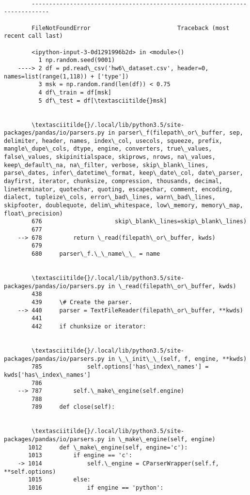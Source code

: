 \documentclass[11pt]{article}
\begin{document}
    \begin{Verbatim}[commandchars=\\\{\}]

        ---------------------------------------------------------------------------

        FileNotFoundError                         Traceback (most recent call last)

        <ipython-input-3-0d1291996b2d> in <module>()
          1 np.random.seed(9001)
    ----> 2 df = pd.read\_csv('hw6\_dataset.csv', header=0, names=list(range(1,118)) + ['type'])
          3 msk = np.random.rand(len(df)) < 0.75
          4 df\_train = df[msk]
          5 df\_test = df[\textasciitilde{}msk]


        \textasciitilde{}/.local/lib/python3.5/site-packages/pandas/io/parsers.py in parser\_f(filepath\_or\_buffer, sep, delimiter, header, names, index\_col, usecols, squeeze, prefix, mangle\_dupe\_cols, dtype, engine, converters, true\_values, false\_values, skipinitialspace, skiprows, nrows, na\_values, keep\_default\_na, na\_filter, verbose, skip\_blank\_lines, parse\_dates, infer\_datetime\_format, keep\_date\_col, date\_parser, dayfirst, iterator, chunksize, compression, thousands, decimal, lineterminator, quotechar, quoting, escapechar, comment, encoding, dialect, tupleize\_cols, error\_bad\_lines, warn\_bad\_lines, skipfooter, doublequote, delim\_whitespace, low\_memory, memory\_map, float\_precision)
        676                     skip\_blank\_lines=skip\_blank\_lines)
        677 
    --> 678         return \_read(filepath\_or\_buffer, kwds)
        679 
        680     parser\_f.\_\_name\_\_ = name


        \textasciitilde{}/.local/lib/python3.5/site-packages/pandas/io/parsers.py in \_read(filepath\_or\_buffer, kwds)
        438 
        439     \# Create the parser.
    --> 440     parser = TextFileReader(filepath\_or\_buffer, **kwds)
        441 
        442     if chunksize or iterator:


        \textasciitilde{}/.local/lib/python3.5/site-packages/pandas/io/parsers.py in \_\_init\_\_(self, f, engine, **kwds)
        785             self.options['has\_index\_names'] = kwds['has\_index\_names']
        786 
    --> 787         self.\_make\_engine(self.engine)
        788 
        789     def close(self):


        \textasciitilde{}/.local/lib/python3.5/site-packages/pandas/io/parsers.py in \_make\_engine(self, engine)
       1012     def \_make\_engine(self, engine='c'):
       1013         if engine == 'c':
    -> 1014             self.\_engine = CParserWrapper(self.f, **self.options)
       1015         else:
       1016             if engine == 'python':



\end{Verbatim}
\end{document}

